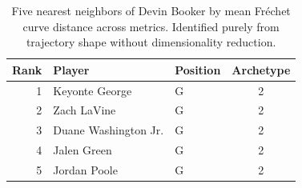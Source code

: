 \begin{table}[htbp]
  \centering\small
  \begin{tabular}{rllc}
    \toprule
    Rank & Player & Position & Archetype \\
    \midrule
    1 & Keyonte George & G & 2 \\
    2 & Zach LaVine & G & 2 \\
    3 & Duane Washington Jr. & G & 2 \\
    4 & Jalen Green & G & 2 \\
    5 & Jordan Poole & G & 2 \\
    \bottomrule
  \end{tabular}
  \caption{Five nearest neighbors of Devin Booker by mean Fr\'{e}chet curve distance across metrics. Identified purely from trajectory shape without dimensionality reduction.}
  \label{tab:Devin_Booker_frechet_curve_neighbors}
\end{table}

